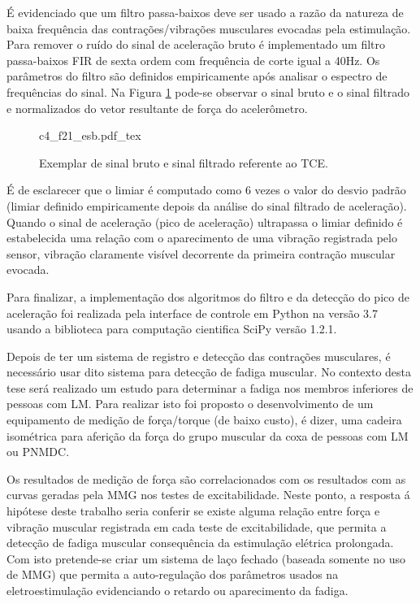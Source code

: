 É evidenciado que um filtro passa-baixos deve ser usado a razão da natureza de baixa frequência das contrações/vibrações musculares evocadas pela estimulação. Para remover o ruído do sinal de aceleração bruto é implementado um filtro passa-baixos \acrshort{FIR} de sexta ordem com frequência de corte igual a 40Hz. Os parâmetros do filtro são definidos empiricamente após analisar o espectro de frequências do sinal. Na Figura \ref{fig:c4_f21_esb} pode-se observar o sinal bruto e o sinal filtrado e normalizados do vetor resultante de força do acelerômetro.

\begin{figure}
    \centering %
    \small %
    \def\svgwidth{0.9\columnwidth}%
    {c4_f21_esb.pdf_tex}
    \caption{Exemplar de sinal bruto e sinal filtrado referente ao \acrshort{TCE}.}
    \label{fig:c4_f21_esb}
\end{figure}

É de esclarecer que o limiar é computado como 6 vezes o valor do desvio padrão (limiar definido empiricamente depois da análise do sinal filtrado de aceleração). Quando o sinal de aceleração (pico de aceleração) ultrapassa o limiar definido é estabelecida uma relação 
 com o aparecimento de uma vibração registrada pelo sensor, vibração claramente visível decorrente da primeira contração muscular evocada. 

Para finalizar, a implementação dos algoritmos do filtro e da detecção do pico de aceleração foi realizada pela interface de controle em Python na versão 3.7 usando a biblioteca para computação cientifica SciPy versão 1.2.1.

Depois de ter um sistema de registro e detecção das contrações musculares, é necessário usar dito sistema para detecção de fadiga muscular. No contexto desta tese será realizado um estudo para determinar a fadiga nos membros inferiores de pessoas com \acrshort{LM}.
Para realizar isto foi proposto o desenvolvimento de um equipamento de medição de força/torque (de baixo custo), é dizer, uma  cadeira isométrica para aferição da força do grupo muscular da coxa de pessoas com \acrshort{LM} ou \acrshort{PNMDC}. 

Os resultados de medição de força são correlacionados com os resultados com as curvas geradas pela \acrshort{MMG} nos testes de excitabilidade. Neste ponto, a resposta á hipótese deste trabalho seria conferir se existe alguma relação entre força e vibração muscular registrada em cada teste de excitabilidade, que permita a detecção de fadiga muscular consequência da estimulação elétrica prolongada. Com isto pretende-se criar um sistema de laço fechado (baseada somente no uso de \acrshort{MMG}) que permita a auto-regulação dos parâmetros usados na eletroestimulação evidenciando o retardo ou aparecimento da fadiga.

